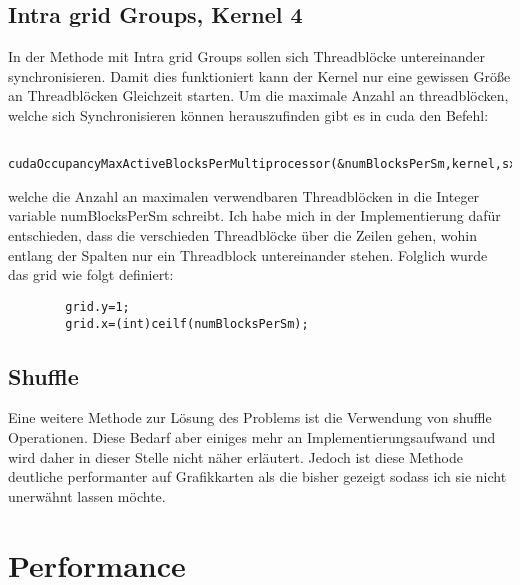 \documentclass[10pt,a4paper]{article}
\begin{document}
	 \subsection{Intra grid Groups, Kernel 4}  
	 In der Methode mit Intra grid Groups sollen sich Threadblöcke untereinander synchronisieren. Damit dies funktioniert kann der Kernel nur eine gewissen Größe an Threadblöcken Gleichzeit starten. Um die maximale Anzahl an threadblöcken, welche sich Synchronisieren können herauszufinden gibt es in cuda den Befehl:
	 \begin{lstlisting}
	 	cudaOccupancyMaxActiveBlocksPerMultiprocessor(&numBlocksPerSm,kernel,sx,0);
	 \end{lstlisting}
 	welche die Anzahl an maximalen verwendbaren Threadblöcken in die Integer variable numBlocksPerSm schreibt. Ich habe mich in der Implementierung dafür entschieden, dass die verschieden Threadblöcke über die Zeilen gehen, wohin entlang der Spalten nur ein Threadblock untereinander stehen. Folglich wurde das grid wie folgt definiert:
 	\begin{lstlisting}
 		grid.y=1;
 		grid.x=(int)ceilf(numBlocksPerSm);
 	\end{lstlisting}
	 \subsection{Shuffle}
	 Eine weitere Methode zur Lösung des Problems ist die Verwendung von shuffle Operationen. Diese Bedarf aber einiges mehr an Implementierungsaufwand und wird daher in dieser Stelle nicht näher erläutert. Jedoch ist diese Methode deutliche performanter auf Grafikkarten als die bisher gezeigt sodass ich sie nicht unerwähnt lassen möchte.

	 \section{Performance}
\end{document}
